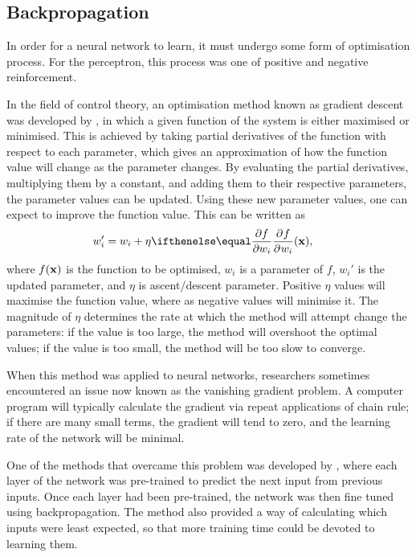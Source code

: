 
\subsection{Backpropagation}

In order for a neural network to learn, it must undergo some form of
optimisation process.
For the perceptron, this process was one of positive and negative reinforcement.

In the field of control theory, an optimisation method known as gradient descent
was developed by \cite{Kelley:1960:Gradient}, in which a given function of the
system is either maximised or minimised.
This is achieved by taking partial derivatives of the function with respect to
each parameter, which gives an approximation of how the function value will
change as the parameter changes.
By evaluating the partial derivatives, multiplying them by a constant, and
adding them to their respective parameters, the parameter values can be updated.
Using these new parameter values, one can expect to improve the function value.
This can be written as
\begin{align*}
    w_i' &= w_i + \eta\Rpdiff{f}{w_i}(\Rvec{x}),
\end{align*}
where $f(\mathbf{x})$ is the function to be optimised, $w_i$ is a parameter of
$f$, $w_i'$ is the updated parameter, and $\eta$ is ascent/descent parameter.
Positive $\eta$ values will maximise the function value, where as negative
values will minimise it.
The magnitude of $\eta$ determines the rate at which the method will attempt
change the parameters: if the value is too large, the method will overshoot the
optimal values; if the value is too small, the method will be too slow to
converge.

When this method was applied to neural networks, researchers sometimes
encountered an issue now known as the vanishing gradient problem.
A computer program will typically calculate the gradient via repeat applications
of chain rule; if there are many small terms, the gradient will tend to zero,
and the learning rate of the network will be minimal.

One of the methods that overcame this problem was developed by
\cite{Schmidhuber:1992:Compression}, where each layer of the network was
pre-trained to predict the next input from previous inputs.
Once each layer had been pre-trained, the network was then fine tuned using
backpropagation.
The method also provided a way of calculating which inputs were least expected,
so that more training time could be devoted to learning them.

